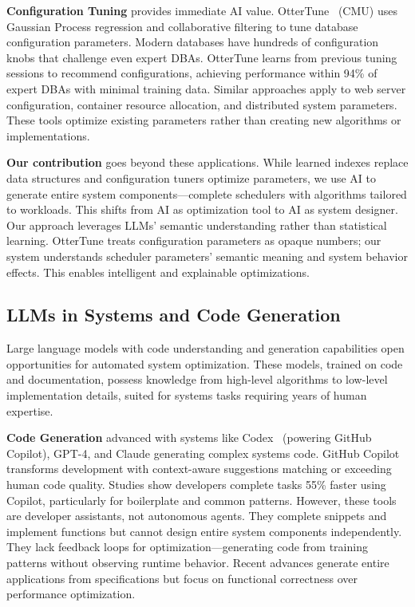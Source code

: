 \textbf{Configuration Tuning} provides immediate AI value. OtterTune~\cite{vanaken2017ottertune} (CMU) uses Gaussian Process regression and collaborative filtering to tune database configuration parameters. Modern databases have hundreds of configuration knobs that challenge even expert DBAs. OtterTune learns from previous tuning sessions to recommend configurations, achieving performance within 94\% of expert DBAs with minimal training data. Similar approaches apply to web server configuration, container resource allocation, and distributed system parameters. These tools optimize existing parameters rather than creating new algorithms or implementations.

\textbf{Our contribution} goes beyond these applications. While learned indexes replace data structures and configuration tuners optimize parameters, we use AI to generate entire system components—complete schedulers with algorithms tailored to workloads. This shifts from AI as optimization tool to AI as system designer. Our approach leverages LLMs' semantic understanding rather than statistical learning. OtterTune treats configuration parameters as opaque numbers; our system understands scheduler parameters' semantic meaning and system behavior effects. This enables intelligent and explainable optimizations.

\subsection{LLMs in Systems and Code Generation}

Large language models with code understanding and generation capabilities open opportunities for automated system optimization. These models, trained on code and documentation, possess knowledge from high-level algorithms to low-level implementation details, suited for systems tasks requiring years of human expertise.

\textbf{Code Generation} advanced with systems like Codex~\cite{chen2021codex} (powering GitHub Copilot), GPT-4, and Claude generating complex systems code. GitHub Copilot transforms development with context-aware suggestions matching or exceeding human code quality. Studies show developers complete tasks 55\% faster using Copilot, particularly for boilerplate and common patterns. However, these tools are developer assistants, not autonomous agents. They complete snippets and implement functions but cannot design entire system components independently. They lack feedback loops for optimization—generating code from training patterns without observing runtime behavior. Recent advances generate entire applications from specifications but focus on functional correctness over performance optimization.

